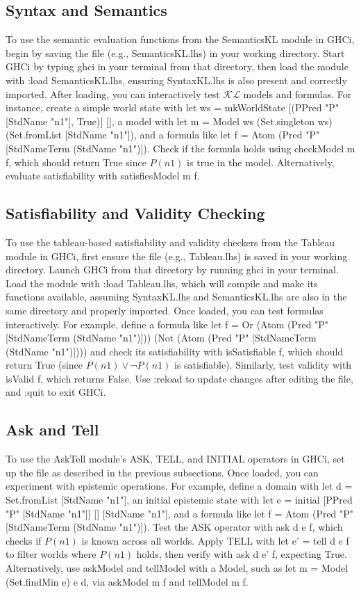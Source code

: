 \documentclass[12pt,a4paper]{article}
\begin{document}
\subsection{Syntax and Semantics}
To use the semantic evaluation functions from the SemanticsKL module in GHCi, begin by saving the file (e.g., SemanticsKL.lhs) in your working directory. Start GHCi by typing ghci in your terminal from that directory, then load the module with :load SemanticsKL.lhs, ensuring SyntaxKL.lhs is also present and correctly imported. After loading, you can interactively test $\mathcal{KL}$ models and formulas. 
For instance, create a simple world state with let ws = mkWorldState [(PPred "P" [StdName "n1"], True)] [], a model with let m = Model ws (Set.singleton ws) (Set.fromList [StdName "n1"]), and a formula like let f = Atom (Pred "P" [StdNameTerm (StdName "n1")]). Check if the formula holds using checkModel m f, which should return True since $P(n1)$ is true in the model. Alternatively, evaluate satisfiability with satisfiesModel m f.

\subsection{Satisfiability and Validity Checking}
To use the tableau-based satisfiability and validity checkers from the Tableau module in GHCi, first ensure the file (e.g., Tableau.lhs) is saved in your working directory. Launch GHCi from that directory by running ghci in your terminal. Load the module with :load Tableau.lhs, which will compile and make its functions available, assuming SyntaxKL.lhs and SemanticsKL.lhs are also in the same directory and properly imported. Once loaded, you can test formulas interactively. For example, define a formula like let f = Or (Atom (Pred "P" [StdNameTerm (StdName "n1")])) (Not (Atom (Pred "P" [StdNameTerm (StdName "n1")]))) and check its satisfiability with isSatisfiable f, which should return True (since $P(n1)\lor \neg P(n1)$ is satisfiable). Similarly, test validity with isValid f, which returns False. Use :reload to update changes after editing the file, and :quit to exit GHCi.

\subsection{Ask and Tell}
To use the AskTell module's ASK, TELL, and INITIAL operators in GHCi, set up the file as described in the previous subsections. 
Once loaded, you can experiment with epistemic operations. For example, define a domain with let d = Set.fromList [StdName "n1"], an initial epistemic state with let e = initial [PPred "P" [StdName "n1"]] [] [StdName "n1"], and a formula like let f = Atom (Pred "P" [StdNameTerm (StdName "n1")]). Test the ASK operator with ask d e f, which checks if $P(n1)$ is known across all worlds.
Apply TELL with let e' = tell d e f to filter worlds where $P(n1)$ holds, then verify with ask d e' f, expecting True. Alternatively, use askModel and tellModel with a Model, such as let m = Model (Set.findMin e) e d, via askModel m f and tellModel m f.
\end{document}
